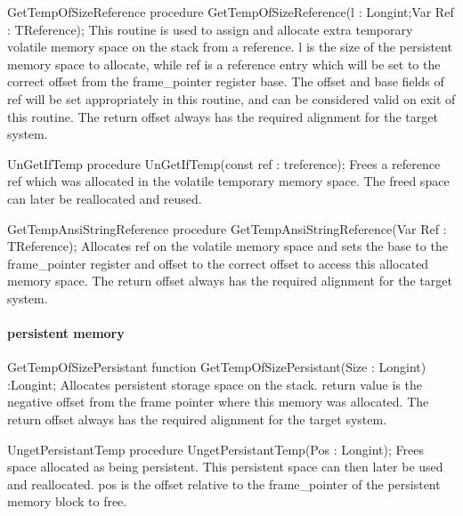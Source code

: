 \documentclass [a4paper,12pt]{article}
\begin{document}
\begin{procedure}{GetTempOfSizeReference}
\Declaration
procedure GetTempOfSizeReference(l : Longint;Var Ref : TReference);
\Description
This routine is used to assign and allocate extra temporary volatile memory
space on the stack from a reference. \textsf{l} is the size of the
persistent memory space to allocate, while \textsf{ref} is a reference entry
which will be set to the correct offset from the frame{\_}pointer register
base. The \textsf{offset} and \textsf{base} fields of \textsf{ref} will be
set appropriately in this routine, and can be considered valid on exit of
this routine.
\Notes
The return offset always has the required alignment for the target system.
\end{procedure}

\begin{procedure}{UnGetIfTemp}
\Declaration
procedure UnGetIfTemp(const ref : treference);
\Description
Frees a reference \textsf{ref} which was allocated in the volatile temporary
memory space. 
\Notes
The freed space can later be reallocated and reused.
\end{procedure}

\begin{procedure}{GetTempAnsiStringReference}
\Declaration
procedure GetTempAnsiStringReference(Var Ref : TReference);
\Description
Allocates \textsf{ref }on the volatile memory space and sets the
\textsf{base} to the frame{\_}pointer register and \textsf{offset} to the
correct offset to access this allocated memory space.
\Notes
The return offset always has the required alignment for the target system.
\end{procedure}

\paragraph{persistent memory}

\begin{function}{GetTempOfSizePersistant}
\Declaration
function GetTempOfSizePersistant(Size : Longint) :Longint;
\Description
Allocates persistent storage space on the stack. return value is the
negative offset from the frame pointer where this memory was allocated.
\Notes
The return offset always has the required alignment for the target system.
\end{function}

\begin{function}{UngetPersistantTemp}
\Declaration
procedure UngetPersistantTemp(Pos : Longint);
\Description
Frees space allocated as being persistent. This persistent space can then
later be used and reallocated. \textsf{pos} is the offset relative to the
frame{\_}pointer of the persistent memory block to free.
\end{function}
\end{document}
